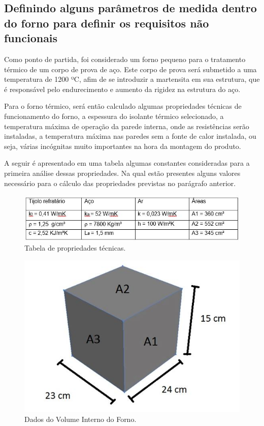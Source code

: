 \subsection{Definindo alguns parâmetros de medida dentro do forno para definir os requisitos não funcionais}

Como ponto de partida, foi considerado um forno pequeno para o tratamento térmico de um corpo de prova de aço. Este corpo de prova será submetido a uma temperatura de 1200 ºC, afim de se introduzir a martensita em sua estrutura, que é responsável pelo endurecimento e aumento da rigidez na estrutura do aço.

Para o forno térmico, será então calculado algumas propriedades técnicas de funcionamento do forno, a espessura do isolante térmico selecionado, a temperatura máxima de operação da parede interna, onde as resistências serão instaladas, a temperatura máxima nas paredes sem a fonte de calor instalada, ou seja, várias incógnitas muito importantes na hora da montagem do produto.

A seguir é apresentado em uma tabela algumas constantes consideradas para a primeira análise dessas propriedades. Na qual estão presentes alguns valores necessário para o cálculo das propriedades previstas no parágrafo anterior.

\begin{figure}[!h]
	\centering
	\label{tab_constantes}
	\includegraphics[keepaspectratio=true,scale=1.0]{figuras/tab_constantes.JPG}
	\caption{Tabela de propriedades técnicas.}
\end{figure}

\begin{figure}[!h]
	\centering
	\label{vol_interno}
	\includegraphics[keepaspectratio=true,scale=1.0]{figuras/vol_interno.JPG}
	\caption{Dados do Volume Interno do Forno.}
\end{figure}

